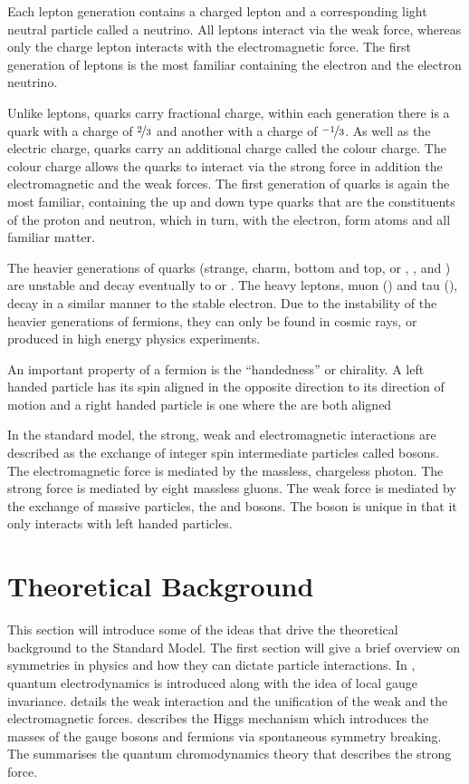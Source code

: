 Each lepton generation contains a charged lepton and a corresponding light
neutral particle called a neutrino. All leptons interact via the weak force,
whereas only the charge lepton interacts with the electromagnetic force.  The
first generation of leptons is the most familiar containing the electron and the
electron neutrino.

Unlike leptons, quarks carry fractional charge, within each generation there is
a quark with a charge of $\nicefrac{2}{3}$ and another with a charge of
$\nicefrac{-1}{3}$. As well as the electric charge, quarks carry an additional
charge called the colour charge. The colour charge allows the quarks to interact
via the strong force in addition the electromagnetic and the weak forces.
The first generation of quarks is again the most familiar, containing the up and
down type quarks that are the constituents of the proton and neutron, which in
turn, with the electron, form atoms and all familiar matter.


The heavier generations of quarks (strange, charm, bottom and top, or \Pstrange,
\Pcharm, \Pbottom and \Ptop) are unstable and decay eventually to \Pup or
\Pdown.
The heavy leptons, muon (\Pmuon) and tau (\Ptau), decay in a similar manner to
the stable electron. 
Due to the instability of the heavier generations of fermions, they can only be
found in  cosmic rays, or produced in high energy physics experiments.

An important property of a fermion is the ``handedness'' or chirality. A left
handed particle has its spin aligned in the opposite direction to its direction
of motion and a right handed particle is one where the are both aligned

In the standard model, the strong, weak and electromagnetic interactions are
described as the exchange of integer spin intermediate particles called bosons.
The electromagnetic force is mediated by the massless, chargeless photon. The
strong force is mediated by eight massless gluons. 
The weak force is mediated by the exchange of massive particles, the \PWpm and \PZ
bosons. The \PWpm boson is unique in that it only interacts with left handed
particles.


\section{Theoretical Background}
This section will introduce some of the ideas that drive the
theoretical background to the Standard Model.
The first section will give a brief overview on symmetries in physics and how
they can dictate particle interactions. In , quantum
electrodynamics is introduced along with the idea of local gauge invariance.
 details the weak interaction and the unification of the weak 
and the electromagnetic forces.  describes the Higgs mechanism
which introduces the masses of the gauge bosons and fermions via spontaneous
symmetry breaking. The  summarises the quantum
chromodynamics theory that describes the strong force.

